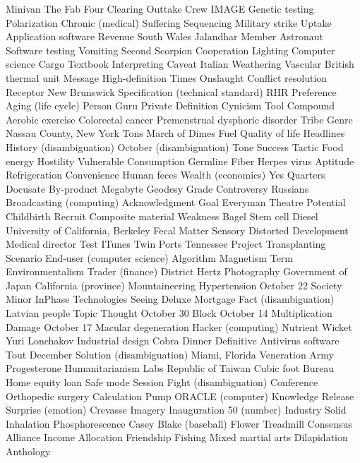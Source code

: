 Minivan  The Fab Four  Clearing  
Outtake  Crew  IMAGE  
Genetic testing  Polarization  Chronic (medical)  
Suffering  Sequencing  Military strike  
Uptake  Application software  Revenue  
South Wales  Jalandhar  Member  
Astronaut  Software testing  Vomiting  
Second  Scorpion  Cooperation  
Lighting  Computer science  Cargo  
Textbook  Interpreting  Caveat  
Italian  Weathering  Vascular  
British thermal unit  Message  High-definition  
Times  Onslaught  Conflict resolution  
Receptor  New Brunswick  Specification (technical standard)  
RHR  Preference  Aging (life cycle)  
Person  Guru  Private  
Definition  Cynicism  Tool  
Compound  Aerobic exercise  Colorectal cancer  
Premenstrual dysphoric disorder  Tribe  Genre  
Nassau County, New York  Tons  March of Dimes  
Fuel  Quality of life  Headlines  
History (disambiguation)  October (disambiguation)  Tone  
Success  Tactic  Food energy  
Hostility  Vulnerable  Consumption  
Germline  Fiber  Herpes virus  
Aptitude  Refrigeration  Convenience  
Human feces  Wealth (economics)  Yes  
Quarters  Docusate  By-product  
Megabyte  Geodesy  Grade  
Controversy  Russians  Broadcasting (computing)  
Acknowledgment  Goal  Everyman Theatre  
Potential  Childbirth  Recruit  
Composite material  Weakness  Bagel  
Stem cell  Diesel  University of California, Berkeley  
Fecal Matter  Sensory  Distorted  
Development  Medical director  Test  
ITunes  Twin Ports  Tennessee  
Project  Transplanting  Scenario  
End-user (computer science)  Algorithm  Magnetism  
Term  Environmentalism  Trader (finance)  
District  Hertz  Photography  
Government of Japan  California (province)  Mountaineering  
Hypertension  October 22  Society  
Minor  InPhase Technologies  Seeing  
Deluxe  Mortgage  Fact (disambiguation)  
Latvian people  Topic  Thought  
October 30  Block  October 14  
Multiplication  Damage  October 17  
Macular degeneration  Hacker (computing)  Nutrient  
Wicket  Yuri Lonchakov  Industrial design  
Cobra  Dinner  Definitive  
Antivirus software  Tout  December  
Solution (disambiguation)  Miami, Florida  Veneration  
Army  Progesterone  Humanitarianism  
Labs  Republic of Taiwan  Cubic foot  
Bureau  Home equity loan  Safe mode  
Session  Fight (disambiguation)  Conference  
Orthopedic surgery  Calculation  Pump  
ORACLE (computer)  Knowledge  Release  
Surprise (emotion)  Crevasse  Imagery  
Inauguration  50 (number)  Industry  
Solid  Inhalation  Phosphorescence  
Casey Blake (baseball)  Flower  Treadmill  
Consensus  Alliance  Income  
Allocation  Friendship  Fishing  
Mixed martial arts  Dilapidation  Anthology  
